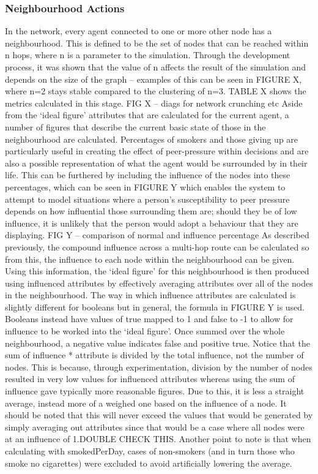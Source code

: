 \documentclass[]{report}
\begin{document}
\subsubsection{Neighbourhood Actions}
In the network, every agent connected to one or more other node has a neighbourhood. This is defined to be the set of nodes that can be reached within n hops, where n is a parameter to the simulation. Through the development process, it was shown that the value of n affects the result of the simulation and depends on the size of the graph – examples of this can be seen in FIGURE X, where n=2 stays stable compared to the clustering of n=3. TABLE X shows the metrics calculated in this stage.
FIG X – diags for network crunching etc
Aside from the `ideal figure' attributes that are calculated for the current agent, a number of figures that describe the current basic state of those in the neighbourhood are calculated. Percentages of smokers and those giving up are particularly useful in creating the effect of peer-pressure within decisions and are also a possible representation of what the agent would be surrounded by in their life. This can be furthered by including the influence of the nodes into these percentages, which can be seen in FIGURE Y which enables the system to attempt to model situations where a person's susceptibility to peer pressure depends on how influential those surrounding them are; should they be of low influence, it is unlikely that the person would adopt a behaviour that they are displaying.
FIG Y – comparison of normal and influence percentage
As described previously, the compound influence across a multi-hop route can be calculated so from this, the influence to each node within the neighbourhood can be given. Using this information, the `ideal figure' for this neighbourhood is then produced using influenced attributes by effectively averaging attributes over all of the nodes in the neighbourhood. The way in which influence attributes are calculated is slightly different for booleans but in general, the formula in FIGURE Y is used. Booleans instead have values of true mapped to 1 and false to -1 to allow for influence to be worked into the `ideal figure'. Once summed over the whole neighbourhood, a negative value indicates false and positive true. Notice that the sum of influence * attribute is divided by the total influence, not the number of nodes. This is because, through experimentation, division by the number of nodes resulted in very low values for influenced attributes whereas using the sum of influence gave typically more reasonable figures. Due to this, it is less a straight average, instead more of a weighed one based on the influence of a node. It should be noted that this will never exceed the values that would be generated by simply averaging out attributes since that would be a case where all nodes were at an influence of 1.DOUBLE CHECK THIS.  Another point to note is that when calculating with smokedPerDay, cases of non-smokers (and in turn those who smoke no cigarettes) were excluded to avoid artificially lowering the average. 
\end{document}
